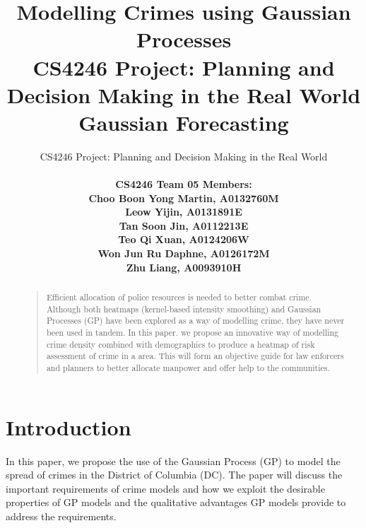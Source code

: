 \documentclass[letterpaper]{article}
\title{\LARGE \bf
	Modelling Crimes using Gaussian Processes\\
	\normalsize CS4246 Project: Planning and Decision Making in the Real World
}
\begin{document}
	\title{Gaussian Forecasting}
	\author{CS4246 Project: Planning and Decision Making in the Real World  \\ \\
		\bf \small CS4246 Team 05 Members:\\
	\small Choo Boon Yong Martin, A0132760M\\
	\small Leow Yijin, A0131891E\\
	\small Tan Soon Jin, A0112213E\\
	\small Teo Qi Xuan, A0124206W\\
	\small Won Jun Ru Daphne, A0126172M\\
	\small Zhu Liang, A0093910H\\
	}	
	
	
	\maketitle
	\thispagestyle{empty}
	\pagestyle{empty}
	
	
	
	\begin{abstract}
	\begin{quote}
		Efficient allocation of police resources is needed to better combat crime. Although both heatmaps (kernel-based intensity smoothing) and Gaussian Processes (GP) have been explored as a way of modelling crime, they have never been used in tandem. 
		In this paper. we propose an innovative way of modelling crime density combined with  demographics to produce a heatmap of risk assessment of crime in a area. This will form an objective guide for law enforcers and planners to better allocate manpower and offer help to the communities.
	\end{quote}
	\end{abstract}
	
	
	\section{Introduction}
	
	In this paper, we propose the use of the Gaussian Process (GP) to model the spread of crimes in the District of Columbia (DC).
	The paper will discuss the important requirements of crime models and how we exploit the desirable properties of GP models and the qualitative advantages GP models provide to address the requirements.\\ \\
\end{document}
